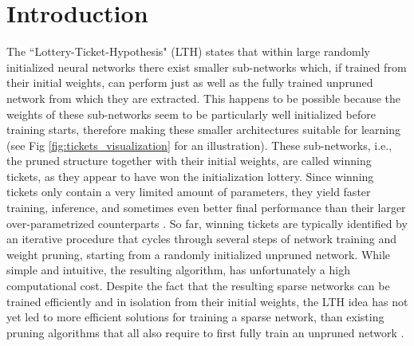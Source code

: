 \section{Introduction}
\label{sec:intro}
The ``Lottery-Ticket-Hypothesis" (LTH) \cite{frankle2018lottery} states that within large randomly initialized neural networks there exist smaller sub-networks which, if trained from their initial weights, can perform just as well as the fully trained unpruned network from which they are extracted. This happens to be possible because the weights of these sub-networks seem to be particularly well initialized before training starts, therefore making these smaller architectures suitable for learning (see Fig \ref{fig:tickets_visualization} for an illustration). These sub-networks, i.e., the pruned structure together with their initial weights, are called winning tickets, as they appear to have won the initialization lottery. Since winning tickets only contain a very limited amount of parameters, they yield faster training, inference, and sometimes even better final performance than their larger over-parametrized counterparts \cite{frankle2018lottery,franklestabilizing}. So far, winning tickets are typically identified by an iterative procedure that cycles through several steps of network training and weight pruning, starting from a randomly initialized unpruned network. While simple and intuitive, the resulting algorithm, has unfortunately a high computational cost. Despite the fact that the resulting sparse networks can be trained efficiently and in isolation from their initial weights, the LTH idea has not yet led to more efficient solutions for training a sparse network, than existing pruning algorithms that all also require to first fully train an unpruned network \cite{han2015deep,molchanov2016pruning,dong2017learning,lin2017runtime,zhuang2018discrimination}.

